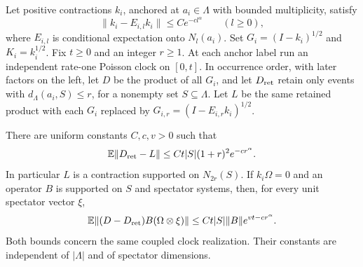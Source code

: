 \begin{lemma}\label{lem:amplification-local-products}
Let positive contractions $k_i$, anchored at $a_i\in\Lambda$ with
bounded multiplicity, satisfy
\[
 \|k_i-E_{i,l}k_i\|\le C e^{-c l^\alpha}\qquad(l\ge0),
\]
where $E_{i,l}$ is conditional expectation onto $N_l(a_i)$.
Set $G_i=(I-k_i)^{1/2}$ and $K_i=k_i^{1/2}$.
Fix $t\ge0$ and an integer $r\ge1$.
At each anchor label run an independent rate-one Poisson clock on
$[0,t]$.  In occurrence order, with later factors on the left, let
$D$ be the product of all $G_i$, and let $D_{\rm ret}$ retain only
events with $d_\Lambda(a_i,S)\le r$, for a nonempty set $S\subseteq\Lambda$.
Let $L$ be the same retained product with each $G_i$ replaced by
$G_{i,r}=(I-E_{i,r}k_i)^{1/2}$.

There are uniform constants $C,c,v>0$ such that
\begin{equation}\label{eq:amplification-product-truncation}
 \mathbb E\|D_{\rm ret}-L\|
 \le Ct|S|(1+r)^2e^{-c r^\alpha}.
\end{equation}
In particular $L$ is a contraction supported on $N_{2r}(S)$.
If $k_i\Omega=0$ and an operator $B$ is supported on $S$ and
spectator systems, then, for every unit spectator vector $\xi$,
\begin{equation}\label{eq:amplification-product-omission}
 \mathbb E\|(D-D_{\rm ret})B(\Omega\otimes\xi)\|
 \le Ct|S|\|B\|e^{vt-c r^\alpha}.
\end{equation}
Both bounds concern the same coupled clock realization.  Their constants
are independent of $|\Lambda|$ and of spectator dimensions.
\end{lemma}

